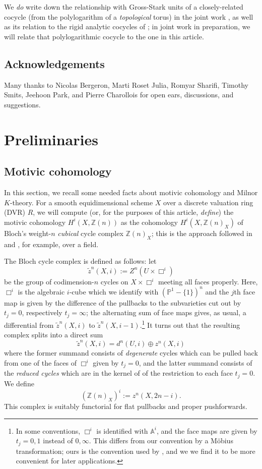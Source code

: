 \documentclass[10pt]{amsart}
\theoremstyle{definition}
\numberwithin{equation}{section}
\begin{document}
    We \emph{do} write down the relationship with Gross-Stark units of a closely-related cocycle (from the polylogarithm of a \emph{topological} torus) in the joint work \cite{RX}, as well as its relation to the rigid analytic cocycles of \cite{DV}; in joint work in preparation, we will relate that polylogarithmic cocycle to the one in this article.

    \subsection{Acknowledgements}

    Many thanks to Nicolas Bergeron, Marti Roset Julia, Romyar Sharifi, Timothy Smits, Jeehoon Park, and Pierre Charollois for open ears, discussions, and suggestions.

    \section{Preliminaries} \label{section:prelim}

    \subsection{Motivic cohomology}\label{section:motivic}
	In this section, we recall some needed facts about motivic cohomology and Milnor $K$-theory. For a smooth equidimensional scheme $X$ over a discrete valuation ring (DVR) $R$, we will compute (or, for the purposes of this article, \emph{define}) the motivic cohomology $H^i(X, \mathbb{Z}(n))$ as the cohomology $H^i(X,\mathbb{Z}(n)_X)$ of Bloch's weight-$n$ \emph{cubical} cycle complex $\mathbb{Z}(n)_X$; this is the approach followed in \cite{Tot} and \cite{GL}, for example, over a field.

    The Bloch cycle complex is defined as follows: let
	\[
	\tilde{z}^n(X, i) := Z^n(U\times \Box^{i})
	\]
	be the group of codimension-$n$ cycles on $X\times \Box^{i}$ meeting all faces properly. Here, $\Box^i$ is the algebraic $i$-cube which we identify with $(\mathbb{P}^1-\{1\})^n$ and the $j$th face map is given by the difference of the pullbacks to the subvarieties cut out by $t_j=0$, respectively $t_j=\infty$; the alternating sum of face maps gives, as usual, a differential from $\tilde{z}^n(X, i)$ to $\tilde{z}^n(X, i-1)$.\footnote{In some conventions, $\Box^i$ is identified with $\mathbb{A}^i$, and the face maps are given by $t_j=0,1$ instead of $0,\infty$. This differs from our convention by a Möbius transformation; ours is the convention used by \cite{Tot}, and we we find it to be more convenient for later applications.} It turns out that the resulting complex splits into a direct sum
	\[
	\tilde{z}^n(X, i) = d^n(U,i)\oplus z^n(X, i)
	\]
	where the former summand consists of \emph{degenerate} cycles which can be pulled back from one of the faces of $\Box^i$ given by $t_j=0$, and the latter summand consists of the \emph{reduced cycles} which are in the kernel of of the restriction to each face $t_j=0$. We define 
	\[
	(\mathbb{Z}(n)_X)^i:=z^n(X, 2n-i).
	\]
	This complex is suitably functorial for flat pullbacks and proper pushforwards.
    
\end{document}
